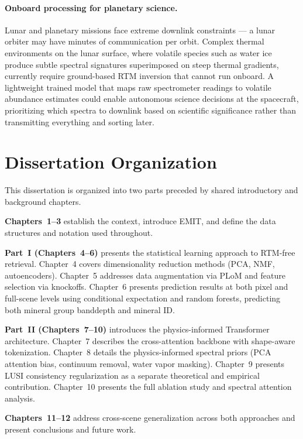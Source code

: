 \documentclass[11pt]{report}
\begin{document}
\paragraph{Onboard processing for planetary science.}
Lunar and planetary missions face extreme downlink constraints --- a lunar orbiter may have minutes of communication per orbit. Complex thermal environments on the lunar surface, where volatile species such as water ice produce subtle spectral signatures superimposed on steep thermal gradients, currently require ground-based RTM inversion that cannot run onboard. A lightweight trained model that maps raw spectrometer readings to volatile abundance estimates could enable autonomous science decisions at the spacecraft, prioritizing which spectra to downlink based on scientific significance rather than transmitting everything and sorting later.

\section{Dissertation Organization}

This dissertation is organized into two parts preceded by shared introductory and background chapters.

\textbf{Chapters~1--3} establish the context, introduce EMIT, and define the data structures and notation used throughout.

\textbf{Part~I (Chapters~4--6)} presents the statistical learning approach to RTM-free retrieval. Chapter~4 covers dimensionality reduction methods (PCA, NMF, autoencoders). Chapter~5 addresses data augmentation via PLoM and feature selection via knockoffs. Chapter~6 presents prediction results at both pixel and full-scene levels using conditional expectation and random forests, predicting both mineral group banddepth and mineral ID.

\textbf{Part~II (Chapters~7--10)} introduces the physics-informed Transformer architecture. Chapter~7 describes the cross-attention backbone with shape-aware tokenization. Chapter~8 details the physics-informed spectral priors (PCA attention bias, continuum removal, water vapor masking). Chapter~9 presents LUSI consistency regularization as a separate theoretical and empirical contribution. Chapter~10 presents the full ablation study and spectral attention analysis.

\textbf{Chapters~11--12} address cross-scene generalization across both approaches and present conclusions and future work.
\end{document}
